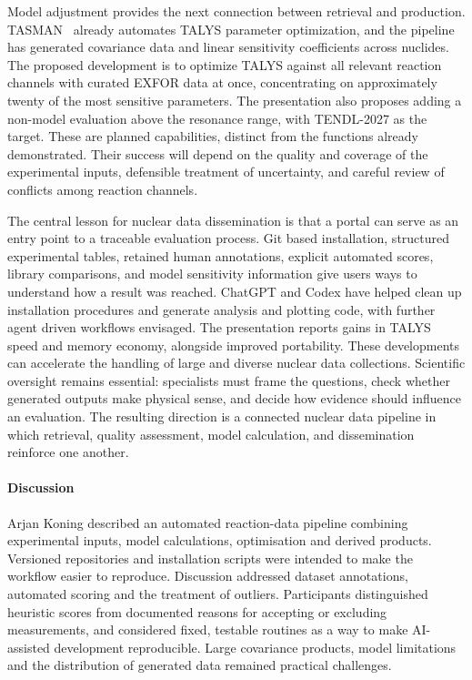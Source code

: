 Model adjustment provides the next connection between retrieval and production. 
TASMAN~\cite{tasman} already automates TALYS parameter optimization, and the pipeline has generated covariance data and linear 
sensitivity coefficients across nuclides. The proposed development is to optimize TALYS against all relevant reaction 
channels with curated EXFOR data at once, concentrating on approximately twenty of the most sensitive parameters. 
The presentation also proposes adding a non-model evaluation above the resonance range, with TENDL-2027 as the target. 
These are planned capabilities, distinct from the functions already demonstrated. Their success will depend on the 
quality and coverage of the experimental inputs, defensible treatment of uncertainty, and careful review of 
conflicts among reaction channels.

The central lesson for nuclear data dissemination is that a portal can serve as an entry point to a traceable evaluation 
process. Git based installation, structured experimental tables, retained human annotations, explicit automated scores, 
library comparisons, and model sensitivity information give users ways to understand how a result was reached. 
ChatGPT and Codex have helped clean up installation procedures and generate analysis and plotting code, with 
further agent driven workflows envisaged. The presentation reports gains in TALYS speed and memory economy, 
alongside improved portability. These developments can accelerate the handling of large and diverse nuclear data 
collections. Scientific oversight remains essential: specialists must frame the questions, check whether generated 
outputs make physical sense, and decide how evidence should influence an evaluation. The resulting direction is a 
connected nuclear data pipeline in which retrieval, quality assessment, model calculation, 
and dissemination reinforce one another.


\paragraph{Discussion}
Arjan Koning described an automated reaction-data pipeline combining experimental inputs, model calculations, optimisation and derived products. Versioned repositories and installation scripts were intended to make the workflow easier to reproduce. Discussion addressed dataset annotations, automated scoring and the treatment of outliers. Participants distinguished heuristic scores from documented reasons for accepting or excluding measurements, and considered fixed, testable routines as a way to make AI-assisted development reproducible. Large covariance products, model limitations and the distribution of generated data remained practical challenges.
